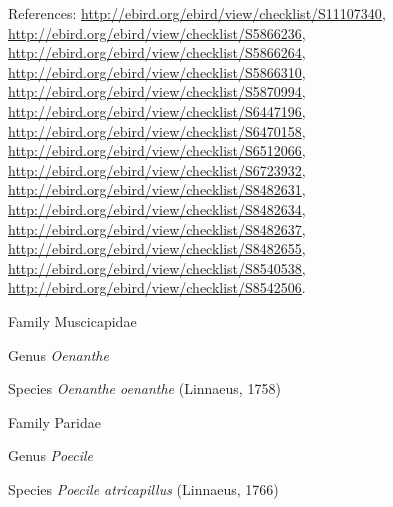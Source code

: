 \documentclass[9pt, article]{memoir}
\begin{document}
\begin{multicols}{2}
\vspace{6pt}References: 
\url{http://ebird.org/ebird/view/checklist/S11107340}, 
\url{http://ebird.org/ebird/view/checklist/S5866236}, 
\url{http://ebird.org/ebird/view/checklist/S5866264}, 
\url{http://ebird.org/ebird/view/checklist/S5866310}, 
\url{http://ebird.org/ebird/view/checklist/S5870994}, 
\url{http://ebird.org/ebird/view/checklist/S6447196}, 
\url{http://ebird.org/ebird/view/checklist/S6470158}, 
\url{http://ebird.org/ebird/view/checklist/S6512066}, 
\url{http://ebird.org/ebird/view/checklist/S6723932}, 
\url{http://ebird.org/ebird/view/checklist/S8482631}, 
\url{http://ebird.org/ebird/view/checklist/S8482634}, 
\url{http://ebird.org/ebird/view/checklist/S8482637}, 
\url{http://ebird.org/ebird/view/checklist/S8482655}, 
\url{http://ebird.org/ebird/view/checklist/S8540538}, 
\url{http://ebird.org/ebird/view/checklist/S8542506}.

\vspace{6pt}\noindent\hspace{24pt}Family Muscicapidae


\vspace{6pt}\noindent\hspace{30pt}Genus \textit{Oenanthe}


\vspace{6pt}\noindent\hspace{36pt}Species \textit{Oenanthe oenanthe} (Linnaeus, 1758)


\vspace{6pt}\noindent\hspace{24pt}Family Paridae


\vspace{6pt}\noindent\hspace{30pt}Genus \textit{Poecile}


\vspace{6pt}\noindent\hspace{36pt}Species \textit{Poecile atricapillus} (Linnaeus, 1766)



\end{multicols}
\end{document}
